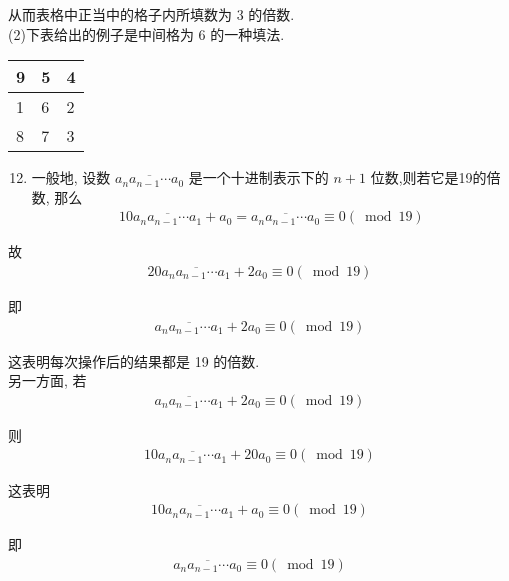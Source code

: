 从而表格中正当中的格子内所填数为 3 的倍数.\\
(2)下表给出的例子是中间格为 6 的一种填法.

\begin{center}
	\begin{tabular}{|l|l|l|}
		\hline
		9 & 5 & 4 \\
		\hline
		1 & 6 & 2 \\
		\hline
		8 & 7 & 3 \\
		\hline
	\end{tabular}
\end{center}

\begin{enumerate}
	\setcounter{enumi}{11}
	\item 一般地, 设数 $\overline{a_{n} a_{n-1} \cdots a_{0}}$ 是一个十进制表示下的 $n+1$ 位数,则若它是19的倍数, 那么
\begin{align*}
		      10 \overline{a_{n} a_{n-1} \cdots a_{1}}+a_{0}=\overline{a_{n} a_{n-1} \cdots a_{0}} \equiv 0(\bmod 19)
	      \end{align*}
\end{enumerate}

故
\begin{align*}
	20 \overline{a_{n} a_{n-1} \cdots a_{1}}+2 a_{0} \equiv 0(\bmod 19)
\end{align*}

即
\begin{align*}
	\overline{a_{n} a_{n-1} \cdots a_{1}}+2 a_{0} \equiv 0(\bmod 19)
\end{align*}

这表明每次操作后的结果都是 19 的倍数. \\
另一方面, 若
\begin{align*}
	\overline{a_{n} a_{n-1} \cdots a_{1}}+2 a_{0} \equiv 0(\bmod 19)
\end{align*}

则
\begin{align*}
	10 \overline{a_{n} a_{n-1} \cdots a_{1}}+20 a_{0} \equiv 0(\bmod 19)
\end{align*}

这表明
\begin{align*}
	10 \overline{a_{n} a_{n-1} \cdots a_{1}}+a_{0} \equiv 0(\bmod 19)
\end{align*}

即
\begin{align*}
	\overline{a_{n} a_{n-1} \cdots a_{0}} \equiv 0(\bmod 19)
\end{align*}

